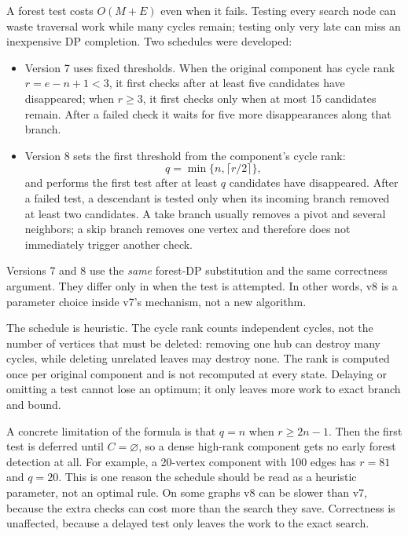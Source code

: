 \documentclass[12pt,a4paper]{report}
\begin{document}
A forest test costs $O(M+E)$ even when it fails.  Testing every search node can
waste traversal work while many cycles remain; testing only very late can miss
an inexpensive DP completion.  Two schedules were developed:
\begin{itemize}
\item Version 7 uses fixed thresholds.  When the original component has cycle
      rank $r=e-n+1<3$, it first checks after at least five candidates have
      disappeared; when $r\ge3$, it first checks only when at most 15
      candidates remain.  After a failed check it waits for five more
      disappearances along that branch.
\item Version 8 sets the first threshold from the component's cycle rank:
      \[
      q=\min\{n,\lceil r/2\rceil\},
      \]
      and performs the first test after at least $q$ candidates have
      disappeared.  After a failed test, a descendant is tested only when its
      incoming branch removed at least two candidates.  A take branch usually
      removes a pivot and several neighbors; a skip branch removes one vertex
      and therefore does not immediately trigger another check.
\end{itemize}

Versions 7 and 8 use the \emph{same} forest-DP substitution and the same
correctness argument.  They differ only in when the test is attempted.  In
other words, v8 is a parameter choice inside v7's mechanism, not a new
algorithm.

The schedule is heuristic.  The cycle rank counts independent cycles, not the
number of vertices that must be deleted: removing one hub can destroy many
cycles, while deleting unrelated leaves may destroy none.  The rank is computed
once per original component and is not recomputed at every state.  Delaying or
omitting a test cannot lose an optimum; it only leaves more work to exact branch
and bound.

A concrete limitation of the formula is that $q=n$ when $r\ge 2n-1$.  Then the
first test is deferred until $C=\varnothing$, so a dense high-rank component gets
no early forest detection at all.  For example, a 20-vertex component with 100
edges has $r=81$ and $q=20$.  This is one reason the schedule should be read as
a heuristic parameter, not an optimal rule.  On some graphs v8 can be slower
than v7, because the extra checks can cost more than the search they save.
Correctness is unaffected, because a delayed test only leaves the work to the
exact search.
\end{document}
